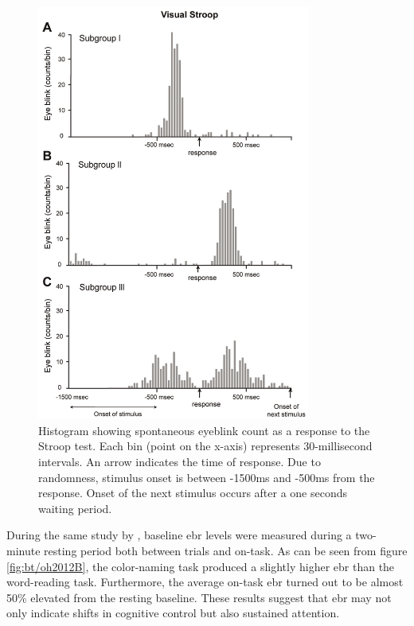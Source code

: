\begin{figure}[h]
    \centering
    \includegraphics[width=0.8\textwidth]{figures/bt_oh2012A.png}
    \caption{Histogram showing spontaneous eyeblink count as a response to the Stroop test. Each bin (point on the x-axis) represents 30-millisecond intervals. An arrow indicates the time of response. Due to randomness, stimulus onset is between -1500ms and -500ms from the response. Onset of the next stimulus occurs after a one seconds waiting period.}
    \label{fig:bt/oh2012A}
\end{figure}

During the same study by \textcite{oh2012}, baseline \acrshort{ebr} levels were measured during a two-minute resting period both between trials and on-task. As can be seen from figure \ref{fig:bt/oh2012B}, the color-naming task produced a slightly higher \acrshort{ebr} than the word-reading task. Furthermore, the average on-task \acrshort{ebr} turned out to be almost 50\% elevated from the resting baseline. These results suggest that \acrshort{ebr} may not only indicate shifts in cognitive control but also sustained attention.

